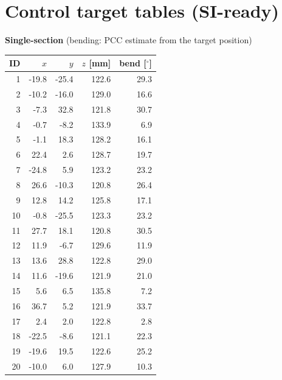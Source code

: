 \documentclass[10pt,a4paper]{article}
\begin{document}
\section{Control target tables (SI-ready)}\label{app:targets}
\begin{minipage}[t]{0.36\linewidth}\scriptsize
\textbf{Single-section} (bending: PCC estimate from the target position)\\[2pt]
\begin{tabular}{rrrrr}
\toprule
ID & $x$ & $y$ & $z$ [mm] & bend [$^\circ$]\\\midrule
1 & -19.8 & -25.4 & 122.6 & 29.3 \\
2 & -10.2 & -16.0 & 129.0 & 16.6 \\
3 & -7.3 & 32.8 & 121.8 & 30.7 \\
4 & -0.7 & -8.2 & 133.9 & 6.9 \\
5 & -1.1 & 18.3 & 128.2 & 16.1 \\
6 & 22.4 & 2.6 & 128.7 & 19.7 \\
7 & -24.8 & 5.9 & 123.2 & 23.2 \\
8 & 26.6 & -10.3 & 120.8 & 26.4 \\
9 & 12.8 & 14.2 & 125.8 & 17.1 \\
10 & -0.8 & -25.5 & 123.3 & 23.2 \\
11 & 27.7 & 18.1 & 120.8 & 30.5 \\
12 & 11.9 & -6.7 & 129.6 & 11.9 \\
13 & 13.6 & 28.8 & 122.8 & 29.0 \\
14 & 11.6 & -19.6 & 121.9 & 21.0 \\
15 & 5.6 & 6.5 & 135.8 & 7.2 \\
16 & 36.7 & 5.2 & 121.9 & 33.7 \\
17 & 2.4 & 2.0 & 122.8 & 2.8 \\
18 & -22.5 & -8.6 & 121.1 & 22.3 \\
19 & -19.6 & 19.5 & 122.6 & 25.2 \\
20 & -10.0 & 6.0 & 127.9 & 10.3 \\
\bottomrule
\end{tabular}
\end{minipage}\hfill
\end{document}
